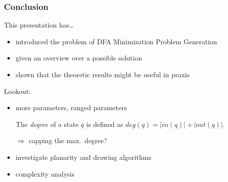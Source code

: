 \documentclass[10pt,usenames,dvipsnames]{beamer}%
\begin{document}
	\begin{frame}
		\frametitle{Conclusion}
		
		This presentation has\ldots
		\begin{itemize}
			\item introduced the problem of DFA Minimization Problem Generation
			\item given an overview over a possible solution
			\item shown that the theoretic results might be useful in praxis
		\end{itemize}\pause
		Lookout:
		\begin{itemize}
			\item more parameters, ranged parameters
			
			The \emph{degree} of a state $q$ is defined as $deg(q) = |in(q)| + |out(q)|$.
			
			$\Rightarrow$ capping the max.\ degree?
			
			\item investigate planarity and drawing algorithms
			\item complexity analysis
		\end{itemize}
	
	\end{frame}

%		
%		
%		
\end{document}

